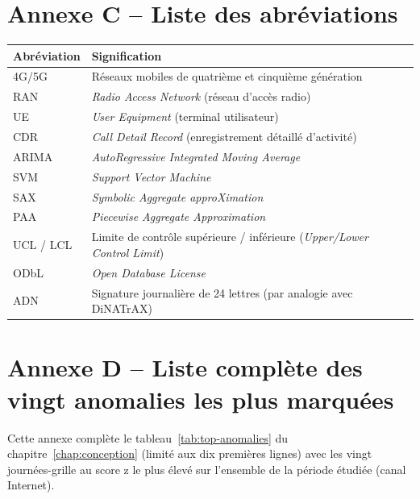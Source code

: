 \clearpage
\chapter*{Annexe C -- Liste des abréviations}
\label{annexe:abreviations}

\begin{table}[htbp]
  \centering
  \begin{tabular}{ll}
    \toprule
    \textbf{Abréviation} & \textbf{Signification} \\
    \midrule
    4G/5G  & Réseaux mobiles de quatrième et cinquième génération \\
    RAN    & \emph{Radio Access Network} (réseau d'accès radio) \\
    UE     & \emph{User Equipment} (terminal utilisateur) \\
    CDR    & \emph{Call Detail Record} (enregistrement détaillé d'activité) \\
    ARIMA  & \emph{AutoRegressive Integrated Moving Average} \\
    SVM    & \emph{Support Vector Machine} \\
    SAX    & \emph{Symbolic Aggregate approXimation} \\
    PAA    & \emph{Piecewise Aggregate Approximation} \\
    UCL / LCL & Limite de contrôle supérieure / inférieure (\emph{Upper/Lower Control Limit}) \\
    ODbL   & \emph{Open Database License} \\
    ADN    & Signature journalière de 24 lettres (par analogie avec DiNATrAX) \\
    \bottomrule
  \end{tabular}
\end{table}

\clearpage
\chapter*{Annexe D -- Liste complète des vingt anomalies les plus marquées}
\label{annexe:top20}

Cette annexe complète le tableau~\ref{tab:top-anomalies} du
chapitre~\ref{chap:conception} (limité aux dix premières lignes) avec
les vingt journées-grille au score z le plus élevé sur l'ensemble de
la période étudiée (canal Internet).

